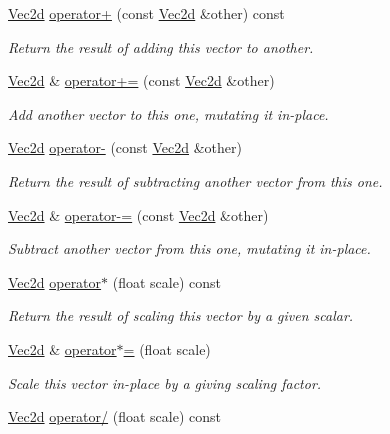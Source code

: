 \begin{DoxyCompactItemize}
\hyperlink{classVec2d}{Vec2d} \hyperlink{classVec2d_a77c0dc8f2313d12a31e0ef18175a6b82}{operator+} (const \hyperlink{classVec2d}{Vec2d} \&other) const
\begin{DoxyCompactList}\small\item\em Return the result of adding this vector to another. \end{DoxyCompactList}\item 
\hyperlink{classVec2d}{Vec2d} \& \hyperlink{classVec2d_af1d5d15fbf2bb45dd189ad1d2202cc59}{operator+=} (const \hyperlink{classVec2d}{Vec2d} \&other)
\begin{DoxyCompactList}\small\item\em Add another vector to this one, mutating it in-\/place. \end{DoxyCompactList}\item 
\hyperlink{classVec2d}{Vec2d} \hyperlink{classVec2d_afc34295bf7a0686003c23f780f9798b4}{operator-\/} (const \hyperlink{classVec2d}{Vec2d} \&other)
\begin{DoxyCompactList}\small\item\em Return the result of subtracting another vector from this one. \end{DoxyCompactList}\item 
\hyperlink{classVec2d}{Vec2d} \& \hyperlink{classVec2d_a1f9d999b49fd6b464ba452a213de9fdd}{operator-\/=} (const \hyperlink{classVec2d}{Vec2d} \&other)
\begin{DoxyCompactList}\small\item\em Subtract another vector from this one, mutating it in-\/place. \end{DoxyCompactList}\item 
\hyperlink{classVec2d}{Vec2d} \hyperlink{classVec2d_afe257286ca7b33600929aeca3201adcc}{operator$\ast$} (float scale) const
\begin{DoxyCompactList}\small\item\em Return the result of scaling this vector by a given scalar. \end{DoxyCompactList}\item 
\hyperlink{classVec2d}{Vec2d} \& \hyperlink{classVec2d_a463da7526e951b360b61c573cdcbe7c2}{operator$\ast$=} (float scale)
\begin{DoxyCompactList}\small\item\em Scale this vector in-\/place by a giving scaling factor. \end{DoxyCompactList}\item 
\hyperlink{classVec2d}{Vec2d} \hyperlink{classVec2d_a5795c07fd4b63ba1a5a8bf69657a625b}{operator/} (float scale) const

\end{DoxyCompactItemize}
